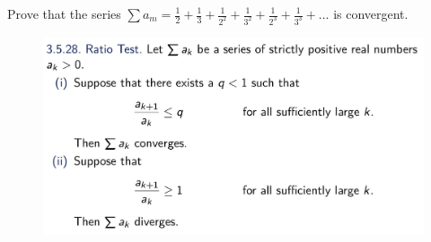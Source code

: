 \documentclass{beamer}
\begin{document}
\begin{frame}
    Prove that the series $\sum a_m=\frac{1}{2}+\frac{1}{3}+\frac{1}{2^2}+\frac{1}{3^2}+\frac{1}{2^3}+\frac{1}{3^3}+...$ is convergent.

\end{frame}

\begin{frame}
    \begin{figure}[htbp]
        \centering
        \includegraphics[width=12cm]{ratio.jpg}
    \end{figure}
\end{frame}
\end{document}

